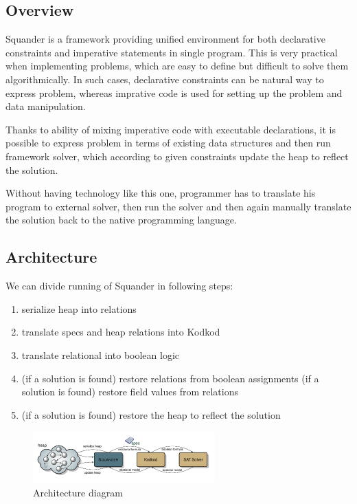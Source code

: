 \documentclass[11pt,twoside,a4paper]{book}
\begin{document}
\subsection{Overview}
Squander is a framework providing unified environment for both declarative
constraints and imperative statements in single program. This is very practical when
implementing problems, which are easy to define but difficult to solve them
algorithmically. In such cases, declarative constraints can be natural way to
express problem, whereas imprative code is used for setting up the problem and
data manipulation.

Thanks to ability of mixing imperative code with executable declarations, it is
possible to express problem in terms of existing data structures and then run
framework solver, which according to given constraints update the heap to
reflect the solution.


Without having technology like this one, programmer has to translate his program
to external solver, then run the solver and then again manually translate the
solution back to the native programming language.

\subsection{Architecture}
We can divide running of Squander in following steps:
\begin{enumerate}
  \item serialize heap into relations
  \item translate specs and heap relations into Kodkod
  \item translate relational into boolean logic
  \item (if a solution is found) restore relations from boolean assignments
  (if a solution is found) restore field values from relations
  \item (if a solution is found) restore the heap to reflect the solution
   
\end{enumerate}
\begin{figure}[ht]
\begin{center}
\includegraphics[width=7cm]{figures/architecture-diagram}
\caption{Architecture diagram}
\label{fig:architecture}
\end{center}
\end{figure}
\end{document}
